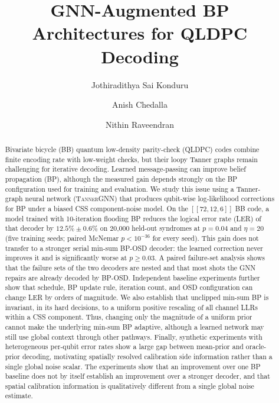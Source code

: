 \documentclass[a4paper,twocolumn,11pt,nopdfoutputerror]{quantumarticle}
\title{GNN-Augmented BP Architectures for QLDPC Decoding}
\author{Jothiradithya Sai Konduru}
\affiliation{Paradise Valley High School, Phoenix, AZ, USA}
\author{Anish Chedalla}
\affiliation{Paradise Valley High School, Phoenix, AZ, USA}
\author{Nithin Raveendran}
\affiliation{Department of Electrical and Computer Engineering,
             University of Arizona, Tucson, AZ, USA}
\newcommand{\code}[3]{\ensuremath{[\![#1,#2,#3]\!]}}
\begin{document}
\maketitle

\begin{abstract}
Bivariate bicycle (BB) quantum low-density parity-check (QLDPC) codes
combine finite encoding rate with low-weight checks, but their loopy
Tanner graphs remain challenging for iterative decoding. Learned
message-passing can improve belief propagation (BP), although the
measured gain depends strongly on the BP configuration used for
training and evaluation. We study this issue using a Tanner-graph
neural network (\textsc{TannerGNN}) that produces qubit-wise log-likelihood
corrections for BP under a biased CSS component-noise model. On the
$\code{72}{12}{6}$ BB code, a model trained with 10-iteration flooding
BP reduces the logical error rate (LER) of that decoder by
$12.5\%\pm0.6\%$ on 20{,}000 held-out syndromes at $p=0.04$ and
$\eta=20$ (five training seeds; paired McNemar $p<10^{-36}$ for every
seed). This gain does not transfer to a stronger serial min-sum BP-OSD
decoder: the learned correction never improves it and is significantly
worse at $p\geq 0.03$. A paired failure-set analysis shows that the
failure sets of the two decoders are nested and that most shots the GNN
repairs are already decoded by BP-OSD. Independent baseline
experiments further show that schedule, BP update rule, iteration count,
and OSD configuration can change LER by orders of magnitude.
We also establish that unclipped min-sum BP is invariant, in its hard
decisions, to a uniform positive rescaling of all channel LLRs within a
CSS component. Thus, changing only the magnitude of a uniform prior
cannot make the underlying min-sum BP adaptive, although a learned
network may still use global context through other pathways. Finally,
synthetic experiments with heterogeneous per-qubit error rates show a
large gap between mean-prior and oracle-prior decoding, motivating
spatially resolved calibration side information rather than a single
global noise scalar. The experiments show that an improvement over one BP baseline does not
by itself establish an improvement over a stronger decoder, and that
spatial calibration information is qualitatively different from a single
global noise estimate.
\end{abstract}

\end{document}
